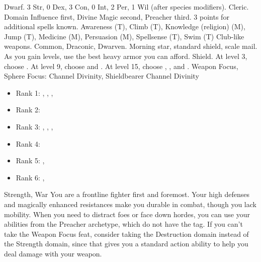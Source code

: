              Dwarf.
             3 Str, 0 Dex, 3 Con, 0 Int, 2 Per, 1 Wil (after species modifiers).
             Cleric.
             Domain Influence first, Divine Magic second, Preacher third.
             3 points for additional spells known.
             Awareness (T), Climb (T), Knowledge (religion) (M), Jump (T), Medicine (M), Persuasion (M), Spellsense (T), Swim (T)
             Club-like weapons.
             Common, Draconic, Dwarven.
             Morning star, standard shield, scale mail. As you gain levels, use the best heavy armor you can afford.
             Shield.
                At level 3, choose .
                At level 9, choose  and .
                At level 15, choose , , and .
             Weapon Focus, Sphere Focus: Channel Divinity, Shieldbearer
             Channel Divinity
            \begin{itemize}
                \item Rank 1: , , , 
                \item Rank 2: 
                \item Rank 3: , , , 
                \item Rank 4: 
                \item Rank 5: , 
                \item Rank 6: , 
            \end{itemize}
             Strength, War
             You are a frontline fighter first and foremost.
            Your high defenses and magically enhanced resistances make you durable in combat, though you lack mobility. 
            When you need to distract foes or face down hordes, you can use your abilities from the Preacher archetype, which do not have the  tag.
            If you can't take the Weapon Focus feat, consider taking the Destruction domain instead of the Strength domain, since that gives you a standard action ability to help you deal damage with your weapon.

